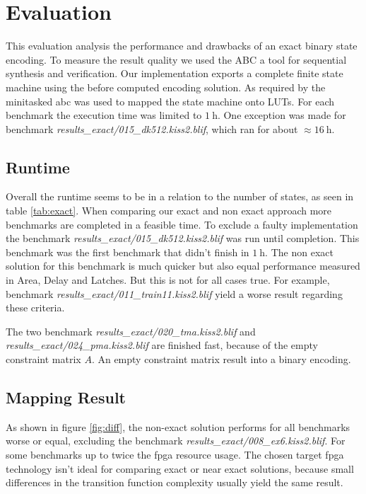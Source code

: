 \chapter{Evaluation}

\label{cha:evaluation}

This evaluation analysis the performance and drawbacks of an exact binary state encoding. To measure the result quality we used the ABC a tool for sequential synthesis and verification. Our implementation exports a complete finite state machine using the before computed encoding solution. As required by the minitasked abc was used to mapped the state machine onto LUTs. For each benchmark the execution time was limited to $\SI{1}{\hour}$. One exception was made for benchmark \textit{results\_exact/015\_dk512.kiss2.blif}, which ran for about $\approx \SI{16}{\hour}$.

\section{Runtime}

Overall the runtime seems to be in a relation to the number of states, as seen in table \ref{tab:exact}. When comparing our exact and non exact approach more benchmarks are completed in a feasible time. To exclude a faulty implementation the benchmark \textit{results\_exact/015\_dk512.kiss2.blif} was run until completion. This benchmark was the first benchmark that didn't finish in $\SI{1}{\hour}$. The non exact solution for this benchmark is much quicker but also equal performance measured in Area, Delay and Latches. But this is not for all cases true. For example, benchmark \textit{results\_exact/011\_train11.kiss2.blif} yield a worse result regarding these criteria.


The two benchmark \textit{results\_exact/020\_tma.kiss2.blif} and \textit{results\_exact/024\_pma.kiss2.blif} are finished fast, because of the empty constraint matrix $A$. An empty constraint matrix result into a binary encoding. 

\section{Mapping Result}

As shown in figure \ref{fig:diff}, the non-exact solution performs for all benchmarks worse or equal, excluding the benchmark \textit{results\_exact/008\_ex6.kiss2.blif}. For some benchmarks up to twice the fpga resource usage. The chosen target fpga technology isn't ideal for comparing exact or near exact solutions, because small differences in the transition function complexity usually yield the same result.

